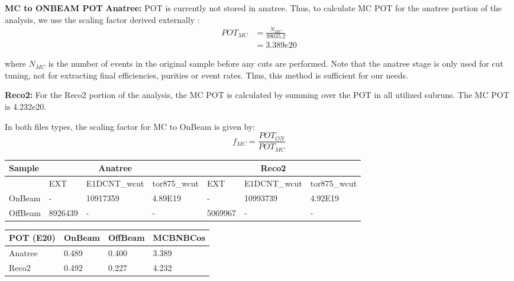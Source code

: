 \documentclass{article}
\begin{document}
\noindent \textbf{MC to ONBEAM POT} 
\noindent \textbf{Anatree:} 
\noindent POT is currently not stored in anatree.  Thus, to calculate MC POT for the anatree portion of the analysis, we use the scaling factor derived externally \cite{bib:normdatamc} :
\begin{align}
  POT_{MC} &= \frac{N_{MC}}{99035.2} \\
  &= 3.389e20
 \end{align}

where $N_{MC}$ is the number of events in the original sample before any cuts are performed. Note that the anatree stage is only used for cut tuning, not for extracting final efficiencies, purities or event rates.  Thus, this method is sufficient for our needs.

\noindent \textbf{Reco2:}
For the Reco2 portion of the analysis, the MC POT is calculated by summing over the POT in all utilized subruns.  The MC POT is 4.232e20.

\noindent  In both files types, the scaling factor for MC to OnBeam is given by:
\begin{equation}
  f_{MC} = \frac{POT_{ON}}{POT_{MC}} 
\end{equation}


\begin{table*} 
 \centering
 \begin{tabular}{| l | l | l | l | l | l | l |  }
  \hline
 Sample  & \multicolumn{1}{c}{} & \multicolumn{1}{c}{Anatree}  & &\multicolumn{1}{c}{}  & \multicolumn{1}{c}{Reco2} &   \\ \hline
 & EXT & E1DCNT\_wcut & tor875\_wcut & EXT  & E1DCNT\_wcut & tor875\_wcut \\ [0.1ex] \hline
OnBeam & - & 10917359 & 4.89E19 & - & 10993739 & 4.92E19 \\ 
OffBeam & 8926439 & - & - & 5069967 & - & - \\ \hline
 \end{tabular}
\end{table*}

\begin{table*} 
 \centering
 \begin{tabular}{| l | l | l | l |}
  \hline
  POT (E20) & OnBeam & OffBeam & MCBNBCos \\ [0.1ex] \hline
Anatree & 0.489 & 0.400 & 3.389 \\ 
Reco2 & 0.492 & 0.227 & 4.232 \\ \hline
 \end{tabular}
\end{table*}
\end{document}
